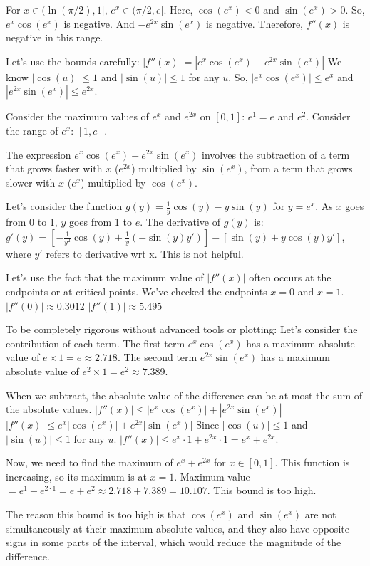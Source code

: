 \documentclass{article}
\begin{document}
For $x \in (\ln(\pi/2), 1]$, $e^x \in (\pi/2, e]$. Here, $\cos(e^x) < 0$ and $\sin(e^x) > 0$.
So, $e^x \cos(e^x)$ is negative.
And $-e^{2x} \sin(e^x)$ is negative.
Therefore, $f''(x)$ is negative in this range.

Let's use the bounds carefully:
$|f''(x)| = |e^x \cos(e^x) - e^{2x} \sin(e^x)|$
We know $|\cos(u)| \le 1$ and $|\sin(u)| \le 1$ for any $u$.
So, $|e^x \cos(e^x)| \le e^x$ and $|e^{2x} \sin(e^x)| \le e^{2x}$.

Consider the maximum values of $e^x$ and $e^{2x}$ on $[0,1]$: $e^1 = e$ and $e^2$.
Consider the range of $e^x$: $[1, e]$.

The expression $e^x \cos(e^x) - e^{2x} \sin(e^x)$ involves the subtraction of a term that grows faster with $x$ ($e^{2x}$) multiplied by $\sin(e^x)$, from a term that grows slower with $x$ ($e^x$) multiplied by $\cos(e^x)$.

Let's consider the function $g(y) = \frac{1}{y} \cos(y) - y \sin(y)$ for $y=e^x$.
As $x$ goes from 0 to 1, $y$ goes from 1 to $e$.
The derivative of $g(y)$ is:
$g'(y) = [-\frac{1}{y^2} \cos(y) + \frac{1}{y}(-\sin(y)y')] - [\sin(y) + y \cos(y) y']$, where $y'$ refers to derivative wrt x. This is not helpful.

Let's use the fact that the maximum value of $|f''(x)|$ often occurs at the endpoints or at critical points. We've checked the endpoints $x=0$ and $x=1$.
$|f''(0)| \approx 0.3012$
$|f''(1)| \approx 5.495$

To be completely rigorous without advanced tools or plotting:
Let's consider the contribution of each term.
The first term $e^x \cos(e^x)$ has a maximum absolute value of $e \times 1 = e \approx 2.718$.
The second term $e^{2x} \sin(e^x)$ has a maximum absolute value of $e^2 \times 1 = e^2 \approx 7.389$.

When we subtract, the absolute value of the difference can be at most the sum of the absolute values.
$|f''(x)| \leq |e^x \cos(e^x)| + |e^{2x} \sin(e^x)|$
$|f''(x)| \leq e^x |\cos(e^x)| + e^{2x} |\sin(e^x)|$
Since $|\cos(u)| \le 1$ and $|\sin(u)| \le 1$ for any $u$.
$|f''(x)| \leq e^x \cdot 1 + e^{2x} \cdot 1 = e^x + e^{2x}$.

Now, we need to find the maximum of $e^x + e^{2x}$ for $x \in [0, 1]$.
This function is increasing, so its maximum is at $x=1$.
Maximum value $= e^1 + e^{2 \cdot 1} = e + e^2 \approx 2.718 + 7.389 = 10.107$.
This bound is too high.

The reason this bound is too high is that $\cos(e^x)$ and $\sin(e^x)$ are not simultaneously at their maximum absolute values, and they also have opposite signs in some parts of the interval, which would reduce the magnitude of the difference.
\end{document}
